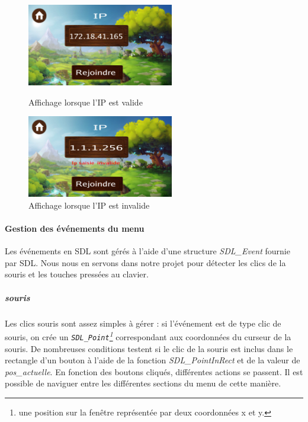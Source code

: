 \documentclass[11pt]{article}
\begin{document}
                \begin{figure}[H]
                    \centering
                    \begin{minipage}{0.45\textwidth}
                        \centering
                        \includegraphics[height=3.6cm]{screenIpOk.png}
                        \caption{Affichage lorsque l'IP est valide}
                        \label{fig:IPOK}
                    \end{minipage}
                    \hfill
                    \begin{minipage}{0.45\textwidth}
                        \centering
                        \includegraphics[height=3.6cm]{screenIpKo.png}
                        \caption{Affichage lorsque l'IP est invalide}
                        \label{fig:IPKO}
                    \end{minipage}
                \end{figure}
                \paragraph{Gestion des événements du menu}\leavevmode\newline
                Les événements en SDL sont gérés à l’aide d’une structure \textit{SDL\_Event} fournie par SDL. Nous nous en servons dans notre projet pour détecter les clics de la souris et les touches pressées au clavier. 

                    \subparagraph{souris}\leavevmode\newline
                    Les clics souris sont assez simples à gérer : si l’événement est de type clic de souris, on crée un \textit{\texttt{SDL\_Point}\footnote{une position sur la fenêtre représentée par deux coordonnées x et y.}} correspondant aux coordonnées du curseur de la souris. De nombreuses conditions testent si le clic de la souris est inclus dans le rectangle d’un bouton à l’aide de la fonction \textit{SDL\_PointInRect} et de la valeur de \textit{pos\_actuelle}. En fonction des boutons cliqués, différentes actions se passent. Il est possible de naviguer entre les différentes sections du menu de cette manière. 
\end{document}
